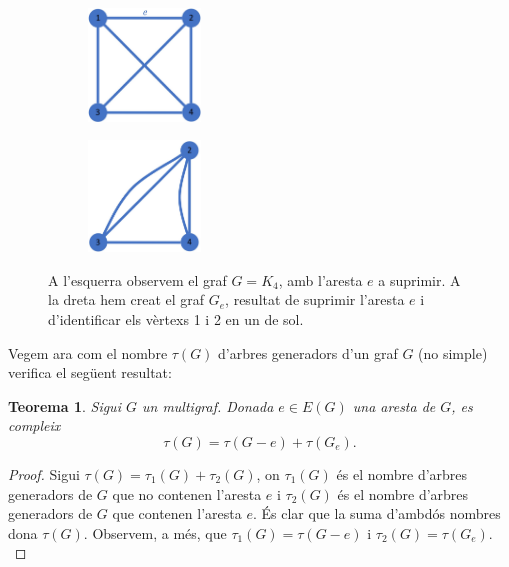 \documentclass{article}
\newtheorem{theorem}{Teorema}[section]
\begin{document}
\begin{figure}[H]
    \centering
    \begin{subfigure}{.45\textwidth}
        \centering
        \includegraphics[width=3cm]{Imatges/graf_e.jpg}
    \end{subfigure}
    \begin{subfigure}{.45\textwidth}
        \centering
        \includegraphics[width=3cm]{Imatges/graf_e_reduit.jpg}
    \end{subfigure}
    \caption{A l'esquerra observem el graf $G=K_4$, amb l'aresta $e$ a suprimir. A la dreta hem creat el graf $G_e$, resultat de suprimir l'aresta $e$ i d'identificar els vèrtexs 1 i 2 en un de sol.}
    \label{ge}
\end{figure}
Vegem ara com el nombre $\tau(G)$ d'arbres generadors d'un graf $G$ (no simple) verifica el següent resultat:
\begin{theorem}
    Sigui $G$ un multigraf. Donada $e\in E(G)$ una aresta de $G$, es compleix $$\tau(G)=\tau(G-e)+\tau(G_e).$$
\end{theorem}
\begin{proof}
    Sigui $\tau(G)=\tau_1(G)+\tau_2(G)$, on $\tau_1(G)$ és el nombre d'arbres generadors de $G$ que no contenen l'aresta $e$ i $\tau_2(G)$ és el nombre d'arbres generadors de $G$ que contenen l'aresta $e$. És clar que la suma d'ambdós nombres dona $\tau (G)$. Observem, a més, que $\tau_1(G)=\tau(G-e)$ i $\tau_2(G)=\tau(G_e)$. \cite{1}
\end{proof}
\end{document}
